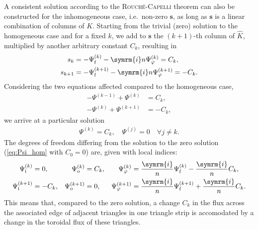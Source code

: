 \documentclass[a4paper, twoside, 10pt, english]{article}
\numberwithin{equation}{section}
\let\temp\varrho
\let\varrho\rho
\let\rho\temp
\let\temp\vartheta
\let\vartheta\theta
\let\theta\temp
\let\temp\varphi
\let\varphi\phi
\let\phi\temp
\let\vec\symbf
\newcommand*\im{\ensuremath{\symrm{i}}}  %
\newcommand*\fs{\ensuremath{\textrm{f}}}  %
\newcommand*\inw{\ensuremath{\textrm{i}}}  %
\newcommand*\out{\ensuremath{\textrm{o}}}  %
\begin{document}
A consistent solution according to the \textsc{Rouché}-\textsc{Capelli} theorem can also be constructed for the inhomogeneous case, i.e.\ non-zero $\vec{s}$, as long as $\vec{s}$ is a linear combination of columns of $K$. Starting from the trivial (zero) solution to the homogeneous case and for a fixed $k$, we add to $\vec{s}$ the $(k+1)$-th column of $\hat{K}$, multiplied by another arbitrary constant $C_{k}$, resulting in
\begin{align}
  s_{k} &= -\Psi_{\fs}^{(k)} - \im n \Psi_{\phi}^{(k)} = C_{k}, \\
  s_{k+1} &= -\Psi_{\fs}^{(k+1)} - \im n \Psi_{\phi}^{(k+1)} = -C_{k}.
\end{align}
Considering the two equations affected compared to the homogeneous case,
\begin{align}
  -\Psi^{(k-1)} + \Psi^{(k)} &= C_{k}, \\
  -\Psi^{(k)} + \Psi^{(k+1)} &= -C_{k},
\end{align}
we arrive at a particular solution
\begin{gather}
  \Psi^{(k)} = C_{k}, \quad \Psi^{(j)} = 0 \quad \forall j \neq k.
\end{gather}
The degrees of freedom differing from the solution to the zero solution (\cref{eq:Psi_hom} with $C_{0} = 0$) are, given with local indices:
\begin{align}
  \Psi_{\inw}^{(k)} &= 0, & \Psi_{\out}^{(k)} &= C_{k}, & \Psi_{\phi}^{(k)} &= \frac{\im}{n} \Psi_{\fs}^{(k)} - \frac{\im}{n} C_{k}, \\
  \Psi_{\inw}^{(k+1)} &= -C_{k}, & \Psi_{\out}^{(k+1)} &= 0, & \Psi_{\phi}^{(k+1)} &= \frac{\im}{n} \Psi_{\fs}^{(k+1)} + \frac{\im}{n} C_{k}.
\end{align}
This means that, compared to the zero solution, a change $C_{k}$ in the flux across the associated edge of adjacent triangles in one triangle strip is accomodated by a change in the toroidal flux of these triangles.
\end{document}
